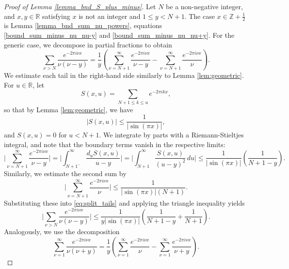 \documentclass[11pt,letterpaper,oneside,reqno]{amsart}
\renewcommand{\^}[1]{\widehat{#1}}
\newcommand{\R}{{\mathbb{R}}}
\newcommand{\Z}{{\mathbb{Z}}}
\numberwithin{equation}{section}
\theoremstyle{remark}
\begin{document}
\begin{proof}[Proof of Lemma \ref{lemma_bnd_S_plus_minus}]
Let $N$ be a non-negative integer, and $x,y\in\R$ satisfying $x$ is not an integer and $1\leq y< N+1$.
%
The case $x\in\Z+\frac{1}{2}$ is Lemma \ref{lemma_bnd_sum_nu_powers}, equations \eqref{bound_sum_minus_nu_nu-y} and \eqref{bound_sum_minus_nu_nu+y}. For the generic case, we decompose in partial fractions to obtain 
\begin{equation} \label{eq:split_tails}
\sum_{\nu>N} \frac{e^{-2\pi i \nu x}}{\nu(\nu-y)} = \frac{1}{y} \left( \sum_{\nu=N+1}^{\infty} \frac{e^{-2\pi i \nu x}}{\nu-y} - \sum_{\nu=N+1}^{\infty} \frac{e^{-2\pi i \nu x}}{\nu} \right).
\end{equation}
We estimate each tail in the right-hand side similarly to Lemma \ref{lem:geometric}. For $u\in\R$, let 
\[S(x,u) = \sum_{N+1\leq k\leq u}e^{-2\pi i k x},\]
so that by Lemma \ref{lem:geometric}, we have
\begin{equation*} %
|S(x,u)| \leq \frac{1}{|\sin(\pi x)|},
\end{equation*}
and $S(x,u)=0$ for $u<N+1$.
We integrate by parts with a Riemann-Stieltjes integral, and note that the boundary terms vanish in the respective limits: 
\begin{equation*}
    \bigg| \sum_{\nu=N+1}^{\infty} \frac{e^{-2\pi i \nu x}}{\nu-y}\bigg|  =
    \bigg| 
\int_{N+1^-}^\infty \frac{d_uS(x,u)}{u-y}
    \bigg| 
    = 
    \bigg| 
    \int_{N+1}^\infty \frac{S(x,u)}{(u-y)^2}\, du 
    \bigg| 
    \leq \frac{1}{|\sin(\pi x)|}\left(\frac{1}{N+1-y} \right).
\end{equation*}
Similarly, we estimate the second sum by
\begin{equation}\label{eq:exp/nu}
\bigg| \sum_{\nu=N+1}^{\infty} \frac{e^{-2\pi i \nu x}}{\nu}\bigg|  \le
    \frac{1}{|\sin(\pi x)|(N+1)}.
\end{equation}
%
Substituting these into \eqref{eq:split_tails} and applying the triangle inequality yields
\begin{equation*}
\bigg|  \sum_{\nu>N} \frac{e^{-2\pi i \nu x}}{\nu(\nu-y)} \bigg|  \leq \frac{1}{y|\sin(\pi x)|} \left( \frac{1}{N+1-y} + \frac{1}{N+1} \right).
\end{equation*}
Analogously, we use the decomposition 
\begin{equation*}
    \sum_{ \nu=1}^{\infty} \frac{e^{-2\pi i \nu x}}{\nu(\nu+y) } = \frac{1}{y} \left( \sum_{\nu=1}^{\infty} \frac{e^{-2\pi i \nu x}}{\nu}  -  \sum_{\nu=1}^{\infty} \frac{e^{-2\pi i \nu x}}{\nu+y}\right).

\end{equation*}
\end{proof}
\end{document}
